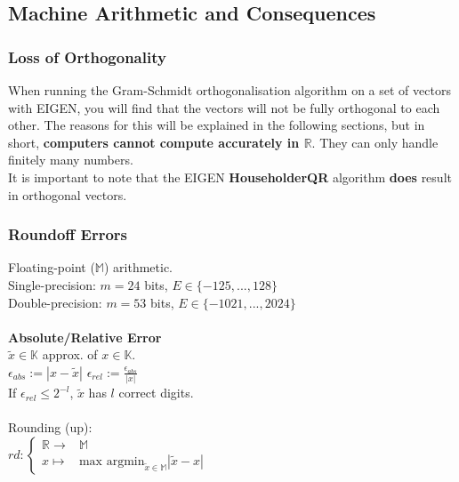 \documentclass[12pt]{article}
\begin{document}
\subsection{Machine Arithmetic and Consequences}
\subsubsection{Loss of Orthogonality}
When running the Gram-Schmidt orthogonalisation algorithm on a set of vectors with EIGEN, you will find that the vectors will not be fully orthogonal to each other. The reasons for this will be explained in the following sections, but in short, \textbf{computers cannot compute accurately in $\mathbb{R}$}. They can only handle finitely many numbers.\\
It is important to note that the EIGEN \textbf{HouseholderQR} algorithm \textbf{does} result in orthogonal vectors.
\subsubsection{}
\subsubsection{Roundoff Errors}
Floating-point ($\mathbb{M}$) arithmetic.\\
Single-precision: $m = 24$ bits, $E \in \{-125, ..., 128\}$\\
Double-precision: $m = 53$ bits, $E \in \{-1021, ..., 2024\}$\\\\
\textbf{Absolute/Relative Error}\\
$\tilde{x} \in \mathbb{K}$ approx. of $x \in \mathbb{K}$.\\
$\epsilon_{abs} := |x - \tilde{x}|$ \hspace{1cm} $\epsilon_{rel} := \frac{\epsilon_{abs}}{|x|}$\\
If $\epsilon_{rel} \leq 2^{-l}$, $\tilde{x}$ has $l$ correct digits.\\\\
Rounding (up):\\
$rd: \begin{cases}\mathbb{R} \to &\mathbb{M} \\ x \mapsto &\text{max argmin}_{\tilde{x}\in \mathbb{M}} |\tilde{x} - x| \end{cases}$
\end{document}

